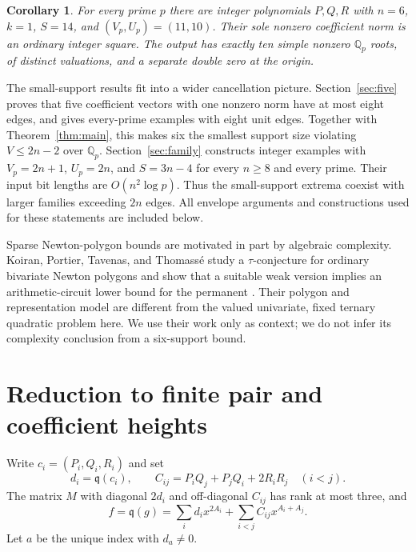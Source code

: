 \documentclass[11pt]{article}
\newtheorem{corollary}[theorem]{Corollary}
\theoremstyle{remark}\newtheorem{remark}[theorem]{Remark}
\newcommand{\qf}{\mathfrak q}
\newcommand{\Q}{\mathbb Q}
\begin{document}
\begin{corollary}\label{cor:prime}
For every prime $p$ there are integer polynomials $P,Q,R$ with
$n=6$, $k=1$, $S=14$, and $(V_p,U_p)=(11,10)$. Their sole nonzero
coefficient norm is an ordinary integer square. The output has exactly
ten simple nonzero $\Q_p$ roots, of distinct valuations, and a separate
double zero at the origin.
\end{corollary}

The small-support results fit into a wider cancellation picture.
Section~\ref{sec:five} proves that five coefficient vectors with one
nonzero norm have at most eight edges, and gives every-prime examples
with eight unit edges. Together with Theorem~\ref{thm:main}, this makes
six the smallest support size violating $V\le2n-2$ over $\Q_p$.
Section~\ref{sec:family} constructs integer examples with
$V_p=2n+1$, $U_p=2n$, and $S=3n-4$ for every $n\ge8$ and every prime.
Their input bit lengths are $O(n^2\log p)$. Thus the small-support
extrema coexist with larger families exceeding $2n$ edges.
All envelope arguments and constructions used for these statements
are included below.

Sparse Newton-polygon bounds are motivated in part by algebraic
complexity. Koiran, Portier, Tavenas, and Thomass\'e study a
$\tau$-conjecture for ordinary bivariate Newton polygons and show that
a suitable weak version implies an arithmetic-circuit lower bound for
the permanent \cite{KPTT}. Their polygon and representation model
are different from the valued univariate, fixed ternary quadratic
problem here. We use their work only as context; we do not infer its
complexity conclusion from a six-support bound.

\section{Reduction to finite pair and coefficient heights}

Write $c_i=(P_i,Q_i,R_i)$ and set
\[
 d_i=\qf(c_i),\qquad
 C_{ij}=P_iQ_j+P_jQ_i+2R_iR_j \quad(i<j).
\]
The matrix $M$ with diagonal $2d_i$ and off-diagonal $C_{ij}$ has rank
at most three, and
\[
 f=\qf(g)=\sum_i d_i x^{2A_i}+\sum_{i<j}C_{ij}x^{A_i+A_j}.
\]
Let $a$ be the unique index with $d_a\ne0$.
\end{document}
